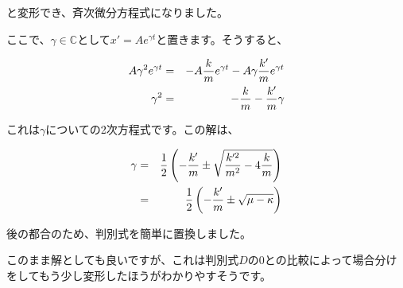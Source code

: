 と変形でき、斉次微分方程式になりました。

ここで、$\gamma \in \mathbb{C}$として$x'=Ae^{\gamma t}$と置きます。そうすると、

\begin{eqnarray}
    A\gamma^2e^{\gamma t} &=& -A\frac{k}{m}e^{\gamma t} - A\gamma\frac{k'}{m}e^{\gamma t} \notag \\
    \gamma^2 &=& -\frac{k}{m} - \frac{k'}{m}\gamma \notag 
\end{eqnarray}

これは$\gamma$についての2次方程式です。この解は、

\begin{eqnarray}
    \gamma &=& \frac{1}{2}\left(-\frac{k'}{m} \pm \sqrt{\frac{k'^2}{m^2}-4\frac{k}{m}}\right) \notag \\
           &=& \frac{1}{2}\left(-\frac{k'}{m} \pm \sqrt{\mu-\kappa}\right) \notag
\end{eqnarray}

後の都合のため、判別式を簡単に置換しました。

このまま解としても良いですが、これは判別式$D$の$0$との比較によって場合分けをしてもう少し変形したほうがわかりやすそうです。

